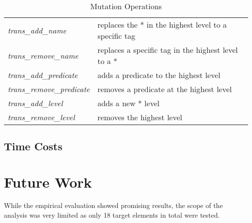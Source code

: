 \documentclass[format=acmlarge, nonacm=true]{acmart}
\begin{document}
\begin{table}
	\caption{Mutation Operations}
	\label{tab:conf}
	\begin{minipage}{\columnwidth}
		\begin{center}
			\begin{tabular}{ll}
				\toprule
					\emph{trans\_add\_name} & replaces the * in the highest level to a specific tag \\
					\emph{trans\_remove\_name} & replaces a specific tag in the highest level to a *\\
				\midrule
					\emph{trans\_add\_predicate} & adds a predicate to the highest level \\
					\emph{trans\_remove\_predicate} & removes a predicate at the highest level \\
				\midrule
					\emph{trans\_add\_level} & adds a new * level\\
					\emph{trans\_remove\_level} & removes the highest level\\
				\bottomrule
			\end{tabular}
		\end{center}
	\end{minipage}
\end{table}
\subsection{Time Costs}



\section{Future Work}
While the empirical evaluation showed promising results, the scope of the analysis was very limited as only 18 target elements in total were tested. 
\end{document}
